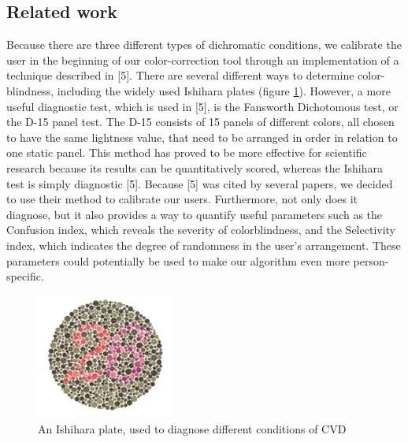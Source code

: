 \documentclass[10pt,twocolumn,letterpaper]{article}
\begin{document}
\subsection{Related work}
	Because there are three different types of dichromatic conditions, we calibrate the user in the beginning of our color-correction tool through an implementation of a technique described in [5]. There are several different ways to determine color-blindness, including the widely used Ishihara plates (figure \ref{fig:plate}). However, a more useful diagnostic test, which is used in [5], is the Fansworth Dichotomous test, or the D-15 panel test. The D-15 consists of 15 panels of different colors, all chosen to have the same lightness value, that need to be arranged in order in relation to one static panel. This method has proved to be more effective for scientific research because its results can be quantitatively scored, whereas the Ishihara test is simply diagnostic [5]. Because [5] was cited by several papers, we decided to use their method to calibrate our users. Furthermore, not only does it diagnose, but it also provides a way to quantify useful parameters such as the Confusion index, which reveals the severity of colorblindness, and the Selectivity index, which indicates the degree of randomness in the user’s arrangement. These parameters could potentially be used to make our algorithm even more person-specific. 

\begin{figure}[h]
  \centering
  \includegraphics[width=0.4\textwidth]{plate.png}
  \caption{An Ishihara plate, used to diagnose different conditions of CVD}
  \label{fig:plate}
\end{figure}
\end{document}
